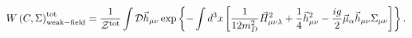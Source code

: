 \begin{equation}
\label{Wwf}
W\left(C,\Sigma\right)_{\rm weak-field}^{\rm tot}=\frac{1}{{\cal Z}^{\rm tot}}
\int{\cal D}\vec h_{\mu\nu}\exp\left\{-\int d^3x\left[\frac{1}{12m_D^2}\vec H_{\mu\nu\lambda}^2
+\frac14\vec h_{\mu\nu}^2-\frac{ig}{2}\vec\mu_\alpha\vec h_{\mu\nu}\Sigma_{\mu\nu}\right]\right\}.
\end{equation}

